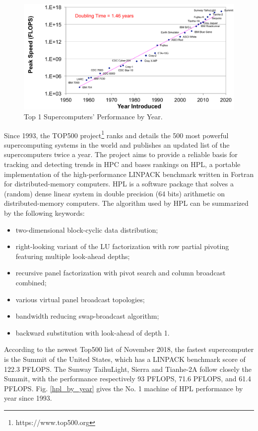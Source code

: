 \begin{figure}[htbp]
	\centering
	\includegraphics[width=6.3in]{fig/sc_evaluate.pdf}
	\caption{Top 1 Supercomputers' Performance by Year.}
	\label{sc_evaluate}
\end{figure}


Since 1993, the TOP500 project\footnote{https://www.top500.org} ranks and details the 500 most powerful supercomputing systems in the world and publishes an updated list of the supercomputers twice a year. The project aims to provide a reliable basis for tracking and detecting trends in HPC and bases rankings on HPL, a portable implementation of the high-performance LINPACK benchmark written in Fortran for distributed-memory computers. HPL is a software package that solves a (random) dense linear system in double precision (64 bits) arithmetic on distributed-memory computers. The algorithm used by HPL can be summarized by the following keywords: 
\begin{itemize}
	\item two-dimensional block-cyclic data distribution;
	\item right-looking variant of the LU factorization with row partial pivoting featuring multiple look-ahead depths;
	\item recursive panel factorization with pivot search and column broadcast combined;
	\item various virtual panel broadcast topologies;
	\item bandwidth reducing swap-broadcast algorithm;
	\item backward substitution with look-ahead of depth 1.
\end{itemize}

According to the newest Top500 list of November 2018, the fastest supercomputer is the Summit of the United States, which has a LINPACK benchmark score of 122.3 PFLOPS. The Sunway TaihuLight, Sierra and Tianhe-2A follow closely the Summit, with the performance respectively 93 PFLOPS, 71.6 PFLOPS, and 61.4 PFLOPS. Fig. \ref{hpl_by_year} gives the No. 1 machine of HPL performance by year since 1993.


